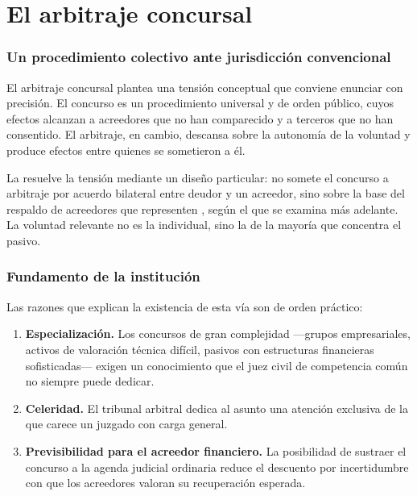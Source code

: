 \chapter{El arbitraje concursal}
\label{cap:arbitraje}


\bloqueTeorico

\subsection{Un procedimiento colectivo ante jurisdicción convencional}

El arbitraje concursal plantea una tensión conceptual que conviene enunciar con
precisión. El concurso es un procedimiento universal y de orden público, cuyos efectos
alcanzan a acreedores que no han comparecido y a terceros que no han consentido. El
arbitraje, en cambio, descansa sobre la autonomía de la voluntad y produce efectos entre
quienes se sometieron a él.

La \LIR{} \citeyearpar{ley-20720} resuelve la tensión mediante un diseño particular: no
somete el concurso a arbitraje por acuerdo bilateral entre deudor y un acreedor, sino sobre
la base del respaldo de acreedores que representen , según el  que se examina más adelante. La voluntad relevante no es la
individual, sino la de la mayoría que concentra el pasivo.

\subsection{Fundamento de la institución}

Las razones que explican la existencia de esta vía son de orden práctico:

\begin{enumerate}
  \item \textbf{Especialización.} Los concursos de gran complejidad ---grupos
  empresariales, activos de valoración técnica difícil, pasivos con estructuras
  financieras sofisticadas--- exigen un conocimiento que el juez civil de competencia
  común no siempre puede dedicar.

  \item \textbf{Celeridad.} El tribunal arbitral dedica al asunto una atención exclusiva
  de la que carece un juzgado con carga general.

  \item \textbf{Previsibilidad para el acreedor financiero.} La posibilidad de sustraer
  el concurso a la agenda judicial ordinaria reduce el descuento por incertidumbre con
  que los acreedores valoran su recuperación esperada.
\end{enumerate}


